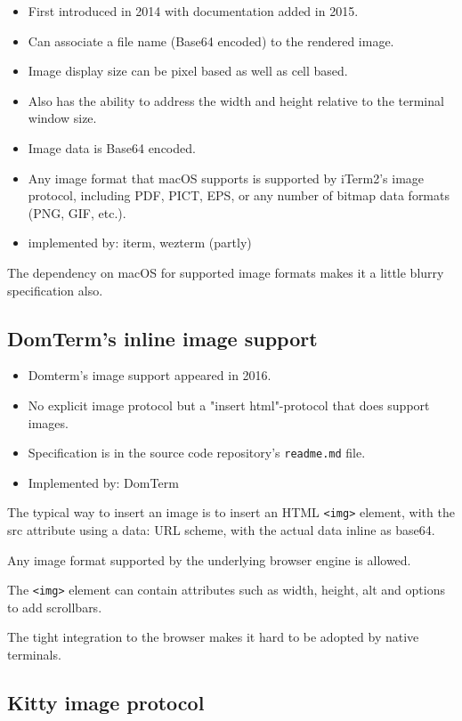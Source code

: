 \documentclass[a4paper]{article}
\begin{document}
\begin{itemize}
    \item First introduced in 2014 with documentation added in 2015.
    \item Can associate a file name (Base64 encoded) to the rendered image.
    \item Image display size can be pixel based as well as cell based.
    \item Also has the ability to address the width and height relative to the terminal window size.
    \item Image data is Base64 encoded.
    \item Any image format that macOS supports is supported by iTerm2's image protocol,
        including PDF, PICT, EPS, or any number of bitmap data formats (PNG, GIF, etc.).
    \item implemented by: iterm, wezterm (partly)
\end{itemize}

The dependency on macOS for supported image formats makes it a little blurry
specification also.

\subsection{DomTerm's inline image support}

\begin{itemize}
    \item Domterm's image support appeared in 2016.
    \item No explicit image protocol but a "insert html"-protocol that does support images.
    \item Specification is in the source code repository's \texttt{readme.md} file.
    \item Implemented by: DomTerm
\end{itemize}

The typical way to insert an image is to insert an HTML \texttt{<img>} element,
with the src attribute using a data: URL scheme,
with the actual data inline as base64.

Any image format supported by the underlying browser engine is allowed.

The \texttt{<img>} element can contain attributes such as width, height, alt
and options to add scrollbars.

The tight integration to the browser makes it hard to be adopted by native
terminals.

\subsection{Kitty image protocol}
\end{document}
